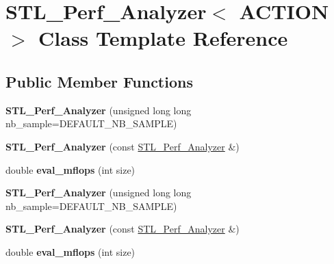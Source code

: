 \hypertarget{class_s_t_l___perf___analyzer}{}\section{S\+T\+L\+\_\+\+Perf\+\_\+\+Analyzer$<$ A\+C\+T\+I\+ON $>$ Class Template Reference}
\label{class_s_t_l___perf___analyzer}
\subsection*{Public Member Functions}
\begin{DoxyCompactItemize}
\item 
\mbox{\label{class_s_t_l___perf___analyzer_a1d132e4fa307a00d08c30a1fe630fdb1}} 
{\bfseries S\+T\+L\+\_\+\+Perf\+\_\+\+Analyzer} (unsigned long long nb\+\_\+sample=D\+E\+F\+A\+U\+L\+T\+\_\+\+N\+B\+\_\+\+S\+A\+M\+P\+LE)
\item 
\mbox{\label{class_s_t_l___perf___analyzer_a5b9f488fa94b76fc3893a41b34617048}} 
{\bfseries S\+T\+L\+\_\+\+Perf\+\_\+\+Analyzer} (const \hyperlink{class_s_t_l___perf___analyzer}{S\+T\+L\+\_\+\+Perf\+\_\+\+Analyzer} \&)
\item 
\mbox{\label{class_s_t_l___perf___analyzer_ac0f2b81496882c7ddc034deb340b514e}} 
double {\bfseries eval\+\_\+mflops} (int size)
\item 
\mbox{\label{class_s_t_l___perf___analyzer_a1d132e4fa307a00d08c30a1fe630fdb1}} 
{\bfseries S\+T\+L\+\_\+\+Perf\+\_\+\+Analyzer} (unsigned long long nb\+\_\+sample=D\+E\+F\+A\+U\+L\+T\+\_\+\+N\+B\+\_\+\+S\+A\+M\+P\+LE)
\item 
\mbox{\label{class_s_t_l___perf___analyzer_a5b9f488fa94b76fc3893a41b34617048}} 
{\bfseries S\+T\+L\+\_\+\+Perf\+\_\+\+Analyzer} (const \hyperlink{class_s_t_l___perf___analyzer}{S\+T\+L\+\_\+\+Perf\+\_\+\+Analyzer} \&)
\item 
\mbox{\label{class_s_t_l___perf___analyzer_ac0f2b81496882c7ddc034deb340b514e}} 
double {\bfseries eval\+\_\+mflops} (int size)
\end{DoxyCompactItemize}



